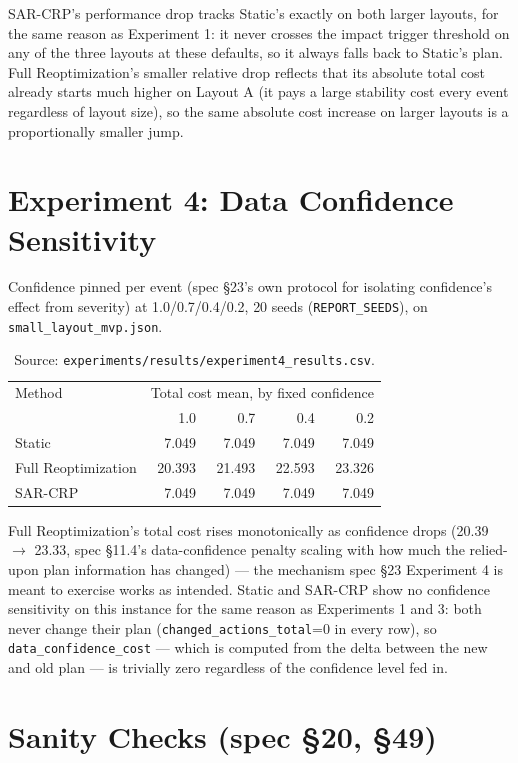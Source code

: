 \documentclass[11pt]{article}
\begin{document}
SAR-CRP's performance drop tracks Static's exactly on both larger layouts,
for the same reason as Experiment 1: it never crosses the impact trigger
threshold on any of the three layouts at these defaults, so it always
falls back to Static's plan. Full Reoptimization's smaller relative drop
reflects that its absolute total cost already starts much higher on
Layout A (it pays a large stability cost every event regardless of
layout size), so the same absolute cost increase on larger layouts is a
proportionally smaller jump.

\section{Experiment 4: Data Confidence Sensitivity}

Confidence pinned per event (spec \S23's own protocol for isolating
confidence's effect from severity) at 1.0/0.7/0.4/0.2, 20 seeds
(\texttt{REPORT\_SEEDS}), on \texttt{small\_layout\_mvp.json}.

\begin{table}[h]
\centering
\small
\begin{tabular}{lrrrr}
\hline
Method & \multicolumn{4}{c}{Total cost mean, by fixed confidence} \\
       & 1.0 & 0.7 & 0.4 & 0.2 \\
\hline
Static & 7.049 & 7.049 & 7.049 & 7.049 \\
Full Reoptimization & 20.393 & 21.493 & 22.593 & 23.326 \\
SAR-CRP & 7.049 & 7.049 & 7.049 & 7.049 \\
\hline
\end{tabular}
\caption{Source: \texttt{experiments/results/experiment4\_results.csv}.}
\end{table}

Full Reoptimization's total cost rises monotonically as confidence drops
(20.39 $\to$ 23.33, spec \S11.4's data-confidence penalty scaling with how
much the relied-upon plan information has changed) --- the mechanism spec
\S23 Experiment 4 is meant to exercise works as intended. Static and
SAR-CRP show no confidence sensitivity on this instance for the same
reason as Experiments 1 and 3: both never change their plan
(\texttt{changed\_actions\_total}=0 in every row), so
\texttt{data\_confidence\_cost} --- which is computed from the delta
between the new and old plan --- is trivially zero regardless of the
confidence level fed in.

\section{Sanity Checks (spec \S20, \S49)}
\end{document}

